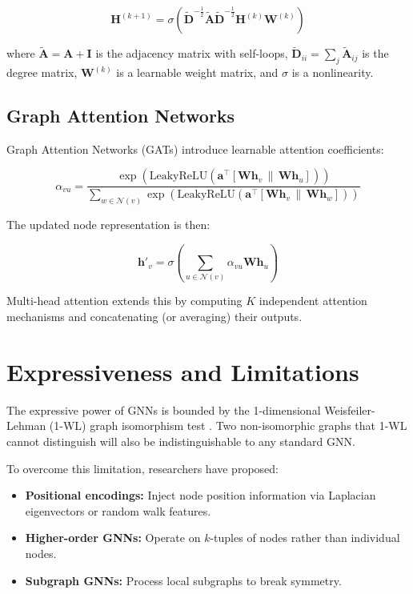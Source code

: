 \documentclass[11pt,a4paper]{article}
\begin{document}
\begin{equation}
\mathbf{H}^{(k+1)} = \sigma\left(
    \tilde{\mathbf{D}}^{-\frac{1}{2}} \tilde{\mathbf{A}} \tilde{\mathbf{D}}^{-\frac{1}{2}}
    \mathbf{H}^{(k)} \mathbf{W}^{(k)}
\right)
\label{eq:gcn}
\end{equation}

where $\tilde{\mathbf{A}} = \mathbf{A} + \mathbf{I}$ is the adjacency matrix with self-loops,
$\tilde{\mathbf{D}}_{ii} = \sum_j \tilde{\mathbf{A}}_{ij}$ is the degree matrix,
$\mathbf{W}^{(k)}$ is a learnable weight matrix, and $\sigma$ is a nonlinearity.

\subsection{Graph Attention Networks}
Graph Attention Networks (GATs) \cite{velickovic2018graph} introduce learnable attention coefficients:

\begin{equation}
\alpha_{vu} = \frac{
    \exp\left(\text{LeakyReLU}\left(\mathbf{a}^\top [\mathbf{W}\mathbf{h}_v \,\|\, \mathbf{W}\mathbf{h}_u]\right)\right)
}{
    \sum_{w \in \mathcal{N}(v)} \exp\left(\text{LeakyReLU}\left(\mathbf{a}^\top [\mathbf{W}\mathbf{h}_v \,\|\, \mathbf{W}\mathbf{h}_w]\right)\right)
}
\label{eq:gat_attention}
\end{equation}

The updated node representation is then:

\begin{equation}
\mathbf{h}'_v = \sigma\left(\sum_{u \in \mathcal{N}(v)} \alpha_{vu} \mathbf{W}\mathbf{h}_u\right)
\label{eq:gat_update}
\end{equation}

Multi-head attention extends this by computing $K$ independent attention mechanisms and concatenating
(or averaging) their outputs.

\section{Expressiveness and Limitations}
The expressive power of GNNs is bounded by the 1-dimensional Weisfeiler-Lehman (1-WL) graph isomorphism
test \cite{xu2019powerful}. Two non-isomorphic graphs that 1-WL cannot distinguish will also be
indistinguishable to any standard GNN.

To overcome this limitation, researchers have proposed:
\begin{itemize}[leftmargin=*]
    \item \textbf{Positional encodings:} Inject node position information via Laplacian eigenvectors or random walk features.
    \item \textbf{Higher-order GNNs:} Operate on $k$-tuples of nodes rather than individual nodes.
    \item \textbf{Subgraph GNNs:} Process local subgraphs to break symmetry.
\end{itemize}
\end{document}

